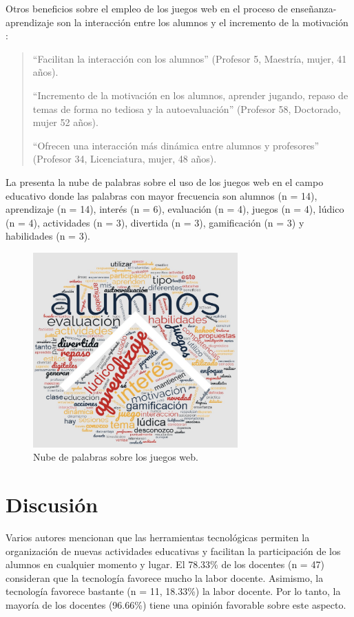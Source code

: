 \documentclass[spanish]{textolivre}
\begin{document}
Otros beneficios sobre el empleo de los juegos web en el proceso de enseñanza-aprendizaje son la interacción entre los alumnos y el incremento de la motivación :

\begin{quote}
“Facilitan la interacción con los alumnos” (Profesor 5, Maestría, mujer, 41 años).

“Incremento de la motivación en los alumnos, aprender jugando, repaso de temas de forma no tediosa y la autoevaluación” (Profesor 58, Doctorado, mujer 52 años).

“Ofrecen una interacción más dinámica entre alumnos y profesores” (Profesor 34, Licenciatura, mujer, 48 años).
\end{quote}

La  presenta la nube de palabras sobre el uso de los juegos web en el campo educativo donde las palabras con mayor frecuencia son alumnos (n = 14), aprendizaje (n = 14), interés (n = 6), evaluación (n = 4), juegos (n = 4), lúdico (n = 4), actividades (n = 3), divertida (n = 3), gamificación (n = 3) y habilidades (n = 3).

\begin{figure}[htbp]
 \centering
 \includegraphics[width=0.7\textwidth]{37074-pag8.png}
 \caption{Nube de palabras sobre los juegos web.}
 \label{fig8}
\end{figure}

\section{Discusión}
Varios autores \cite{bawaaneh2021, karatas2021, maphosa2021} mencionan que las herramientas tecnológicas permiten la organización de nuevas actividades educativas y facilitan la participación de los alumnos en cualquier momento y lugar. El 78.33\% de los docentes (n = 47) consideran que la tecnología favorece mucho la labor docente. Asimismo, la tecnología favorece bastante (n = 11, 18.33\%) la labor docente. Por lo tanto, la mayoría de los docentes (96.66\%) tiene una opinión favorable sobre este aspecto.
\end{document}
